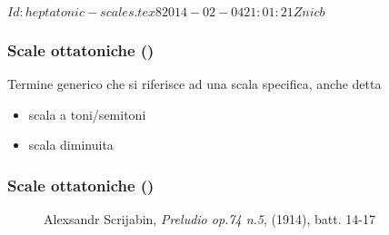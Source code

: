 %
%
\svnInfo $Id: heptatonic-scales.tex 8 2014-02-04 21:01:21Z nicb $

\setcounter{ms}{0}
\begin{frame}
    \frametitle{Scale ottatoniche ()}

    Termine generico che si riferisce ad una scala specifica,
    anche detta

    \begin{itemize}
        \item scala a toni/semitoni
        \item scala diminuita
    \end{itemize}

    \begin{center}
    \end{center}

\end{frame}

\begin{frame}
    \frametitle{Scale ottatoniche ()}

    \begin{center}
      \begin{figure}
          \caption{Alexsandr Scrijabin, \emph{Preludio op.74 n.5}, (1914), batt. 14-17}
      \end{figure}
    \end{center}

\end{frame}

